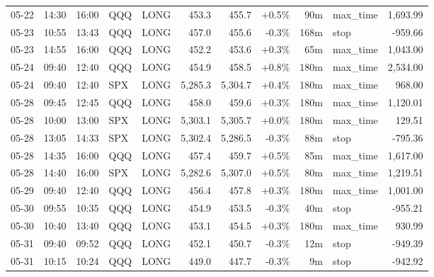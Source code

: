 \documentclass[11pt,a4paper,twoside]{article}
\begin{document}
\begin{center}
\begin{longtable}{>{\color{txtmain}}l l l l l r r r r >{\color{txtmain}}l r}
05-22 & 14:30 & 16:00 & QQQ & LONG & 453.3 & 455.7 & \textcolor{wingreen}{+0.5\%} & 90m & max\_time & \textcolor{wingreen}{1,693.99} \\
05-23 & 10:55 & 13:43 & QQQ & LONG & 457.0 & 455.6 & \textcolor{lossred}{-0.3\%} & 168m & stop & \textcolor{lossred}{-959.66} \\
05-23 & 14:55 & 16:00 & QQQ & LONG & 452.2 & 453.6 & \textcolor{wingreen}{+0.3\%} & 65m & max\_time & \textcolor{wingreen}{1,043.00} \\
05-24 & 09:40 & 12:40 & QQQ & LONG & 454.9 & 458.5 & \textcolor{wingreen}{+0.8\%} & 180m & max\_time & \textcolor{wingreen}{2,534.00} \\
05-24 & 09:40 & 12:40 & SPX & LONG & 5,285.3 & 5,304.7 & \textcolor{wingreen}{+0.4\%} & 180m & max\_time & \textcolor{wingreen}{968.00} \\
05-28 & 09:45 & 12:45 & QQQ & LONG & 458.0 & 459.6 & \textcolor{wingreen}{+0.3\%} & 180m & max\_time & \textcolor{wingreen}{1,120.01} \\
05-28 & 10:00 & 13:00 & SPX & LONG & 5,303.1 & 5,305.7 & \textcolor{wingreen}{+0.0\%} & 180m & max\_time & \textcolor{wingreen}{129.51} \\
05-28 & 13:05 & 14:33 & SPX & LONG & 5,302.4 & 5,286.5 & \textcolor{lossred}{-0.3\%} & 88m & stop & \textcolor{lossred}{-795.36} \\
05-28 & 14:35 & 16:00 & QQQ & LONG & 457.4 & 459.7 & \textcolor{wingreen}{+0.5\%} & 85m & max\_time & \textcolor{wingreen}{1,617.00} \\
05-28 & 14:40 & 16:00 & SPX & LONG & 5,282.6 & 5,307.0 & \textcolor{wingreen}{+0.5\%} & 80m & max\_time & \textcolor{wingreen}{1,219.51} \\
05-29 & 09:40 & 12:40 & QQQ & LONG & 456.4 & 457.8 & \textcolor{wingreen}{+0.3\%} & 180m & max\_time & \textcolor{wingreen}{1,001.00} \\
05-30 & 09:55 & 10:35 & QQQ & LONG & 454.9 & 453.5 & \textcolor{lossred}{-0.3\%} & 40m & stop & \textcolor{lossred}{-955.21} \\
05-30 & 10:40 & 13:40 & QQQ & LONG & 453.1 & 454.5 & \textcolor{wingreen}{+0.3\%} & 180m & max\_time & \textcolor{wingreen}{930.99} \\
05-31 & 09:40 & 09:52 & QQQ & LONG & 452.1 & 450.7 & \textcolor{lossred}{-0.3\%} & 12m & stop & \textcolor{lossred}{-949.39} \\
05-31 & 10:15 & 10:24 & QQQ & LONG & 449.0 & 447.7 & \textcolor{lossred}{-0.3\%} & 9m & stop & \textcolor{lossred}{-942.92} \\

\end{longtable}
\end{center}
\end{document}
